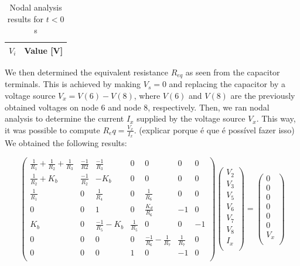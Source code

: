 
\begin{table}[h!]
  \centering
  \begin{tabular}{|l|r|}
    \hline    
    {\bf $V_i$} & {\bf Value [V]} \\ \hline
    
    \hline
  \end{tabular}
  \caption{Nodal analysis results for $t < 0$ s}
  \label{tab:Nodal}
\end{table}


We then determined the equivalent resistance $R_{eq}$ as seen from the capacitor terminals. This is achieved by making $V_s=0$ and replacing the capacitor by a voltage source $V_x=V(6)-V(8)$, where $V(6)$ and $V(8)$ are the previously obtained voltages on node 6 and node 8, respectively. Then, we ran nodal analysis to determine the current $I_x$ supplied by the voltage source $V_x$. This way, it was possible to compute $R_eq= \frac{V_x}{I_x}$. (explicar porque é que é possível fazer isso) We obtained the following results:


\begin{equation}
\begin{pmatrix}

\frac{1}{R_1} + \frac{1}{R_2} + \frac{1}{R_3} & \frac{-1}{R2} & \frac{-1}{R_3} & 0 & 0 & 0 & 0\\
\frac{1}{R_2} + K_b & \frac{-1}{R_2} & -K_b & 0 & 0 & 0 & 0\\
\frac{1}{R_1} & 0 & \frac{1}{R_4} & 0 & \frac{1}{R_6} & 0 & 0\\
0 & 0 & 1 & 0 & \frac{K_d}{R_6} & -1 & 0\\
K_b & 0 & \frac{-1}{R_5} - K_b & \frac{1}{R_5} & 0 & 0 & -1\\
0 & 0 & 0 & 0 & \frac{-1}{R_6} - \frac{1}{R_7} & \frac{1}{R_7} & 0\\
0 & 0 & 0 & 1 & 0 & -1 & 0\\


\end{pmatrix}
\begin{pmatrix}
V_2\\
V_3\\
V_5\\
V_6\\
V_7\\
V_8\\
I_x\\
\end{pmatrix}
=
\begin{pmatrix}
0\\
0\\
0\\
0\\
0\\
0\\
V_x\\
\end{pmatrix}
\label{eq:NodalVs0}
\end{equation}

